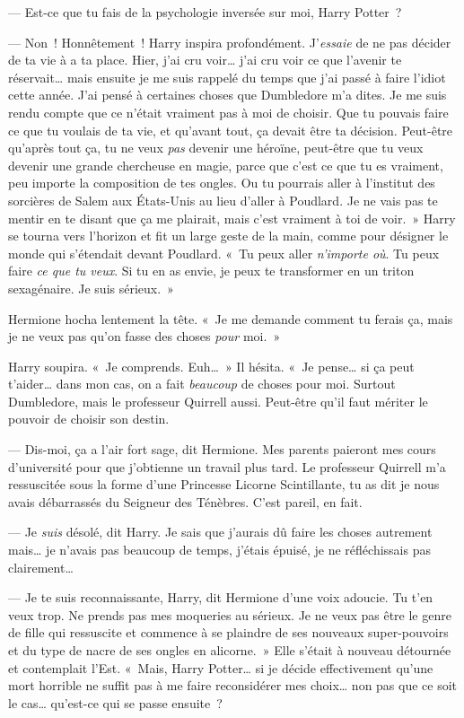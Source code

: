 --- Est-ce que tu fais de la psychologie inversée sur moi, Harry Potter~?

--- Non~! Honnêtement~! Harry inspira profondément. J'\emph{essaie} de ne pas décider de ta vie à a ta place. Hier, j'ai cru voir… j'ai cru voir ce que l'avenir te réservait… mais ensuite je me suis rappelé du temps que j'ai passé à faire l'idiot cette année. J'ai pensé à certaines choses que Dumbledore m'a dites. Je me suis rendu compte que ce n'était vraiment pas à moi de choisir. Que tu pouvais faire ce que tu voulais de ta vie, et qu'avant tout, ça devait être ta décision. Peut-être qu'après tout ça, tu ne veux \emph{pas} devenir une héroïne, peut-être que tu veux devenir une grande chercheuse en magie, parce que c'est ce que tu es vraiment, peu importe la composition de tes ongles. Ou tu pourrais aller à l'institut des sorcières de Salem aux États-Unis au lieu d'aller à Poudlard. Je ne vais pas te mentir en te disant que ça me plairait, mais c'est vraiment à toi de voir.~» Harry se tourna vers l'horizon et fit un large geste de la main, comme pour désigner le monde qui s'étendait devant Poudlard. «~Tu peux aller \emph{n'importe où}. Tu peux faire \emph{ce que tu veux}. Si tu en as envie, je peux te transformer en un triton sexagénaire. Je suis sérieux.~»

Hermione hocha lentement la tête. «~Je me demande comment tu ferais ça, mais je ne veux pas qu'on fasse des choses \emph{pour} moi.~»

Harry soupira. «~Je comprends. Euh…~» Il hésita. «~Je pense… si ça peut t'aider… dans mon cas, on a fait \emph{beaucoup} de choses pour moi. Surtout Dumbledore, mais le professeur Quirrell aussi. Peut-être qu'il faut mériter le pouvoir de choisir son destin.

--- Dis-moi, ça a l'air fort sage, dit Hermione. Mes parents paieront mes cours d'université pour que j'obtienne un travail plus tard. Le professeur Quirrell m'a ressuscitée sous la forme d'une Princesse Licorne Scintillante, tu as dit je nous avais débarrassés du Seigneur des Ténèbres. C'est pareil, en fait.

--- Je \emph{suis} désolé, dit Harry. Je sais que j'aurais dû faire les choses autrement mais… je n'avais pas beaucoup de temps, j'étais épuisé, je ne réfléchissais pas clairement…

--- Je te suis reconnaissante, Harry, dit Hermione d'une voix adoucie. Tu t'en veux trop. Ne prends pas mes moqueries au sérieux. Je ne veux pas être le genre de fille qui ressuscite et commence à se plaindre de ses nouveaux super-pouvoirs et du type de nacre de ses ongles en alicorne.~» Elle s'était à nouveau détournée et contemplait l'Est. «~Mais, Harry Potter… si je décide effectivement qu'une mort horrible ne suffit pas à me faire reconsidérer mes choix… non pas que ce soit le cas… qu'est-ce qui se passe ensuite~?

